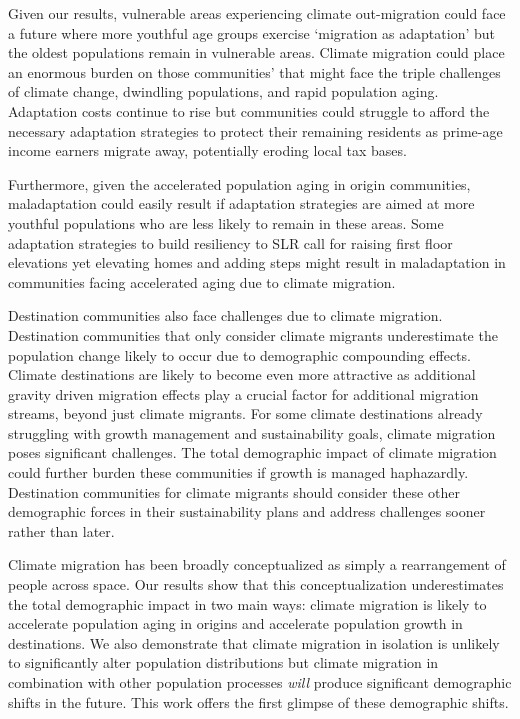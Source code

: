 \documentclass[12pt]{article}
\begin{document}
Given our results, vulnerable areas experiencing climate out-migration
could face a future where more youthful age groups exercise `migration
as adaptation' but the oldest populations remain in vulnerable areas.
Climate migration could place an enormous burden on those communities'
that might face the triple challenges of climate change, dwindling
populations, and rapid population aging. Adaptation costs continue to
rise \citep{buchner2014global} but communities could struggle to afford
the necessary adaptation strategies to protect their remaining residents
as prime-age income earners migrate away, potentially eroding local tax
bases.

Furthermore, given the accelerated population aging in origin
communities, maladaptation could easily result if adaptation strategies
are aimed at more youthful populations who are less likely to remain in
these areas. Some adaptation strategies to build resiliency to SLR call
for raising first floor elevations \citep{dedekorkut2020tide} yet
elevating homes and adding steps might result in maladaptation in
communities facing accelerated aging due to climate migration.

Destination communities also face challenges due to climate migration.
Destination communities that only consider climate migrants
underestimate the population change likely to occur due to demographic
compounding effects. Climate destinations are likely to become even more
attractive as additional gravity driven migration effects play a crucial
factor for additional migration streams, beyond just climate migrants.
For some climate destinations already struggling with growth management
and sustainability goals, climate migration poses significant
challenges. The total demographic impact of climate migration could
further burden these communities if growth is managed haphazardly.
Destination communities for climate migrants should consider these other
demographic forces in their sustainability plans and address challenges
sooner rather than later.

Climate migration has been broadly conceptualized as simply a
rearrangement of people across space. Our results show that this
conceptualization underestimates the total demographic impact in two
main ways: climate migration is likely to accelerate population aging in
origins and accelerate population growth in destinations. We also
demonstrate that climate migration in isolation is unlikely to
significantly alter population distributions but climate migration in
combination with other population processes \emph{will} produce
significant demographic shifts in the future. This work offers the first
glimpse of these demographic shifts.
\end{document}
